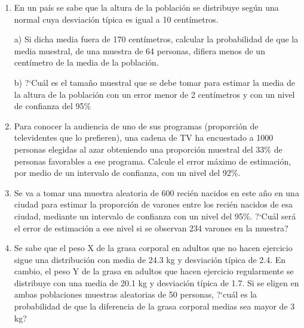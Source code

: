 \begin{adjustwidth}{20pt}{10pt}
\begin{enumerate}[PB. 1. ]
		
		\hspace{-1cm}\vspace{1cm}
		
	\item 	En un país se sabe que la altura de la población se distribuye según una normal cuya desviación típica es igual a 10 centímetros.
	
a) Si dicha media fuera de 170 centímetros, calcular la probabilidad de que la media muestral, de una muestra de 64 personas, difiera menos de un centímetro de la media de la población.

b) ?`Cuál es el tamaño muestral que se debe tomar para estimar la media de la altura de la población con un error menor de 2 centímetros y con un nivel de confianza del 95\%


		
		\hspace{-1cm}\vspace{1cm}
		
	\item 	Para conocer la audiencia de uno de sus programas (proporción de televidentes que lo prefieren), una cadena de TV ha encuestado a 1000 personas elegidas al azar obteniendo una proporción muestral del 33\% de personas favorables a ese programa. Calcule el error máximo de estimación, por medio de un intervalo de confianza, con un nivel del 92\%.

		
		\hspace{-1cm}\vspace{1cm}

	\item 	Se va a tomar una muestra aleatoria de 600 recién nacidos en este año en una ciudad para estimar la proporción de varones entre los recién nacidos de esa ciudad, mediante un intervalo de confianza con un nivel del 95\%. ?`Cuál será el error de estimación a ese nivel si se observan 234 varones en la muestra? 
		
		\hspace{-1cm}\vspace{1cm}
		
	\item 	Se sabe que el peso X de la grasa corporal en adultos que no hacen ejercicio sigue una distribución con media de 24.3 kg y desviación típica de 2.4. En cambio, el peso Y de la grasa en adultos que hacen ejercicio regularmente se distribuye con una media de 20.1 kg y desviación típica de 1.7. Si se eligen en ambas poblaciones muestras aleatorias de 50 personas, ?`cuál es la probabilidad de que la diferencia de la grasa corporal medias sea mayor de 3 kg?


\end{enumerate}
\end{adjustwidth}
